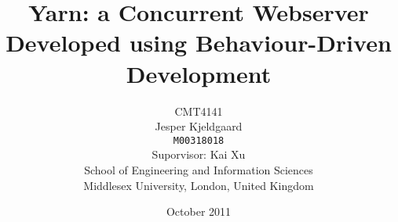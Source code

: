 \title{Yarn: a Concurrent Webserver Developed using Behaviour-Driven
  Development}
\author{CMT4141\\
Jesper Kjeldgaard\\
\small \texttt{M00318018}\\
\small Suporvisor: Kai Xu\\
\small School of Engineering and Information Sciences\\[-0.8ex]
\small Middlesex University, London, United Kingdom\\
}
\date{October 2011}
\maketitle
